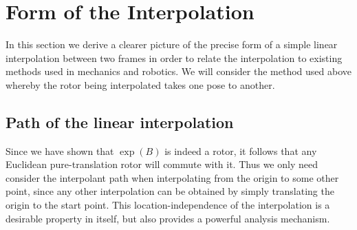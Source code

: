 
\section{Form of the Interpolation}

In this section we derive a clearer picture of the precise form of
a simple linear interpolation between two frames in order to relate the 
interpolation to existing methods used in mechanics and robotics. We will consider
the method used above whereby the rotor being interpolated takes one pose to another.

\subsection{Path of the linear interpolation}

Since we have shown that $\exp(B)$ is indeed a rotor, it follows that any
Euclidean pure-translation rotor will commute with it. Thus we only need consider the
interpolant path when interpolating from the origin to some other point, since
any other interpolation can be obtained by simply translating the origin to
the start point. This location-independence of the interpolation is a 
desirable property in itself, but also provides a powerful analysis mechanism.

